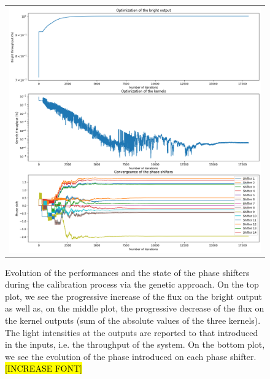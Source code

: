 \documentclass{aa}
\begin{document}
            \begin{figure}
                \begin{center}
                \begin{tabular}{c}
                \includegraphics[width=\linewidth]{img/calibration_genetic.png}
                \end{tabular}
                \end{center}
                \caption[Calibration Genetic] 
                { \label{fig:calibration_genetic} 
                Evolution of the performances and the state of the phase shifters during the calibration process via the genetic approach. On the top plot, we see the progressive increase of the flux on the bright output as well as, on the middle plot, the progressive decrease of the flux on the kernel outputs (sum of the absolute values of the three kernels). The light intensities at the outputs are reported to that introduced in the inputs, i.e. the throughput of the system. On the bottom plot, we see the evolution of the phase introduced on each phase shifter. \hl{[INCREASE FONT]}}
            \end{figure}
    
\end{document}
